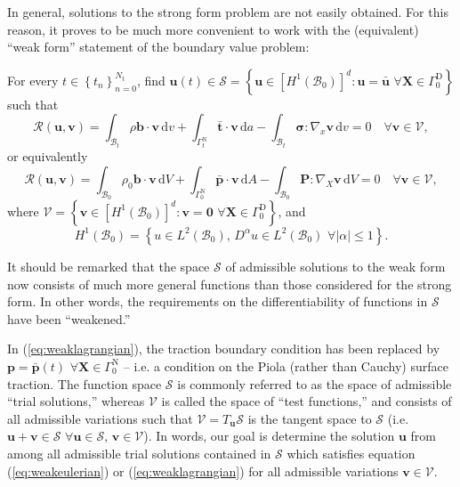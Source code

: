In general, solutions to the strong form problem are not easily obtained. For this reason, it proves to be much more convenient to work with the (equivalent) ``weak form'' statement of the boundary value problem:

For every $t \in \left\{ t_n \right\}_{n=0}^{N_{\mathrm t}}$, find $\bm{u}(t) \in \mathcal{S} = \left\{ \bm{u} \in \left[H^{1} (\mathcal{B}_0)\right]^d \colon \bm{u} = \bar{\bm{u}} \, \, \forall \bm{X} \in \Gamma^{\mathrm D}_0 \right\}$ such that
\begin{equation}
  \mathcal{R}(\bm{u}, \bm{v}) = \int_{\mathcal{B}_t} \rho \bm{b} \cdot \bm{v} \, \mathrm dv + \int_{\Gamma^{\mathrm N}_t} \bar{\bm{t}} \cdot \bm{v} \, \mathrm da - \int_{\mathcal{B}_t} \boldsymbol{\sigma} \colon \nabla_x \bm{v} \, \mathrm dv = 0 \quad \forall \bm{v} \in \mathcal{V},
  \label{eq:weakeulerian}
\end{equation}
or equivalently
\begin{equation}
  \mathcal{R}(\bm{u}, \bm{v}) = \int_{\mathcal{B}_0} \rho_0 \bm{b} \cdot \bm{v} \, \mathrm dV + \int_{\Gamma^{\mathrm N}_0} \bar{\bm{p}} \cdot \bm{v} \, \mathrm dA - \int_{\mathcal{B}_0} \bm{P} \colon \nabla_X \bm{v} \, \mathrm dV = 0 \quad \forall \bm{v} \in \mathcal{V},
  \label{eq:weaklagrangian}
\end{equation}
where $\mathcal{V} = \left\{ \bm{v} \in \left[H^{1} (\mathcal{B}_0)\right]^d \colon \bm{v} = \bm{0} \, \, \forall \bm{X} \in \Gamma^{\mathrm D}_0 \right\}$, and
\begin{equation}
  H^{1} (\mathcal{B}_0) = \left\{ u \in L^2 (\mathcal{B}_0), \, D^{\alpha} u \in L^2 (\mathcal{B}_0) \, \, \forall | \alpha | \leq 1 \right\}.
\end{equation}

It should be remarked that the space $\mathcal{S}$ of admissible solutions to the weak form now consists of much more general functions than those considered for the strong form. In other words, the requirements on the differentiability of functions in $\mathcal{S}$ have been ``weakened.''

In (\ref{eq:weaklagrangian}), the traction boundary condition has been replaced by $\bm{p} = \bar{\bm{p}}(t) \, \, \forall \bm{X} \in \Gamma^{\mathrm N}_0$ -- i.e. a condition on the Piola (rather than Cauchy) surface traction. The function space $\mathcal{S}$ is commonly referred to as the space of admissible ``trial solutions,'' whereas $\mathcal{V}$ is called the space of ``test functions,'' and consists of all admissible variations such that $\mathcal{V} = T_{\bm{u}} \mathcal{S}$ is the tangent space to $\mathcal{S}$ (i.e. $\bm{u} + \bm{v} \in \mathcal{S} \, \, \forall \bm{u} \in \mathcal{S}, \, \bm{v} \in \mathcal{V}$). In words, our goal is determine the solution $\bm{u}$ from among all admissible trial solutions contained in $\mathcal{S}$ which satisfies equation (\ref{eq:weakeulerian}) or (\ref{eq:weaklagrangian}) for all admissible variations $\bm{v} \in \mathcal{V}$.

